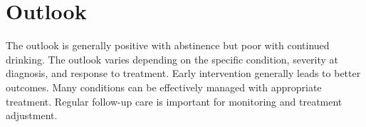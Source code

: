 \section{Outlook}
The outlook is generally positive with abstinence but poor with continued drinking. The outlook varies depending on the specific condition, severity at diagnosis, and response to treatment. Early intervention generally leads to better outcomes. Many conditions can be effectively managed with appropriate treatment. Regular follow-up care is important for monitoring and treatment adjustment.
